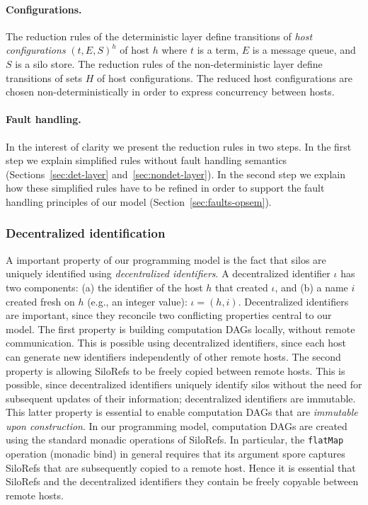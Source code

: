\documentclass[preprint]{sigplanconf}
\theoremstyle{definition}
\theoremstyle{definition}
\begin{document}
\paragraph{Configurations.}

The reduction rules of the deterministic layer define transitions of \emph{host
configurations} $(t, E, S)^h$ of host $h$ where $t$ is a term, $E$ is a message
queue, and $S$ is a silo store. The reduction rules of the non-deterministic
layer define transitions of sets $H$ of host configurations. The reduced host
configurations are chosen non-deterministically in order to express concurrency
between hosts.

\paragraph{Fault handling.}

In the interest of clarity we present the reduction rules in two steps. In the
first step we explain simplified rules without fault handling semantics
(Sections~\ref{sec:det-layer} and~\ref{sec:nondet-layer}). In the second step
we explain how these simplified rules have to be refined in order to support
the fault handling principles of our model (Section~\ref{sec:faults-opsem}).

\subsubsection{Decentralized identification}

A important property of our programming model is the fact that silos are
uniquely identified using \emph{decentralized identifiers}. A decentralized
identifier $\iota$ has two components: (a) the identifier of the host $h$ that
created $\iota$, and (b) a name $i$ created fresh on $h$ (e.g., an integer
value): $\iota = (h, i)$. Decentralized identifiers are important, since they
reconcile two conflicting properties central to our model. The first property
is building computation DAGs locally, without remote communication. This is
possible using decentralized identifiers, since each host can generate new
identifiers independently of other remote hosts. The second property is
allowing SiloRefs to be freely copied between remote hosts. This is possible,
since decentralized identifiers uniquely identify silos without the need for
subsequent updates of their information; decentralized identifiers are
immutable. This latter property is essential to enable computation DAGs that
are \emph{immutable upon construction}. In our programming model, computation
DAGs are created using the standard monadic operations of SiloRefs. In
particular, the \texttt{flatMap} operation (monadic bind) in general requires
that its argument spore captures SiloRefs that are subsequently copied to a
remote host. Hence it is essential that SiloRefs and the decentralized
identifiers they contain be freely copyable between remote hosts.
\end{document}
